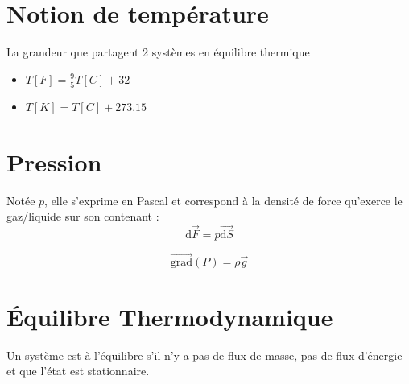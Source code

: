 \documentclass[french]{yLectureNote}
\renewcommand{\vec}{\overrightarrow}
\renewcommand{\vec}{\overrightarrow}
\newcommand{\dd}[0]{\mathrm{d}}
\begin{document}
\section{Notion de température}

\begin{definition}
[Température]
    La grandeur que partagent 2 systèmes en équilibre thermique

\end{definition}

\begin{theorem}
    \begin{itemize}
        \item $T[F] = \frac95 T[C]+32$
        \item $T[K] = T[C]+273.15$
    \end{itemize}

\end{theorem}
\section{Pression}

\begin{definition}
[Pression]
    Notée $p$, elle s'exprime en Pascal et correspond à la densité de force qu'exerce le gaz/liquide sur son contenant :$$\dd \vec{F} = p\vec{\dd S}$$

\end{definition}

\begin{theorem}
    $$\vec{\text{grad}}(P) = \rho \vec{g}$$

\end{theorem}



\section{Équilibre Thermodynamique}

\begin{definition}
    Un système est à l'équilibre s'il n'y a pas de flux de masse, pas de flux d'énergie et que l'état est stationnaire.

\end{definition}
\end{document}
